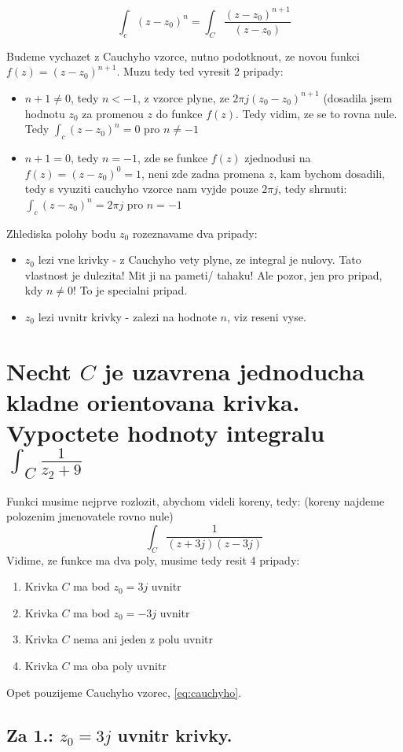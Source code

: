 $$\int_c (z-z_0)^n = \int_C \frac{(z-z_0)^{n+1}}{(z-z_0)}$$

Budeme vychazet z Cauchyho vzorce, nutno podotknout, ze novou funkci $f(z) = (z-z_0)^{n+1}$. Muzu tedy ted vyresit 2 pripady:
\begin{itemize}
\item $n+1 \neq 0$, tedy $n < -1$, z vzorce plyne, ze $2\pi j (z_0 - z_0)^{n+1}$ (dosadila jsem hodnotu $z_0$ za promenou $z$ do funkce $f(z)$. Tedy vidim, ze se to rovna nule. Tedy  $\int_c (z-z_0)^n = 0$ pro $n \neq -1$
\item $n+1 = 0$, tedy $n = -1$, zde se funkce $f(z)$ zjednodusi na $f(z)=(z-z_0)^0 = 1$, neni zde zadna promena $z$, kam bychom dosadili, tedy s vyuziti cauchyho vzorce nam vyjde pouze $2\pi j$, tedy shrnuti:
 $\int_c (z-z_0)^n = 2\pi j$ pro $n= -1$
\end{itemize}

Zhlediska polohy bodu $z_0$ rozeznavame dva pripady:
\begin{itemize}
\item $z_0$ lezi vne krivky - z Cauchyho vety plyne, ze integral je nulovy. Tato vlastnost je dulezita! Mit ji na pameti/ tahaku! Ale pozor, jen pro pripad, kdy $n \neq 0$! To je specialni pripad.
\item $z_0$ lezi uvnitr krivky - zalezi na hodnote $n$, viz reseni vyse. 
\end{itemize}

\newpage

\section{Necht $C$ je uzavrena jednoducha kladne orientovana krivka. Vypoctete hodnoty integralu $\int_C \frac{1}{z_2+9}$}

Funkci musime nejprve rozlozit, abychom videli koreny, tedy: (koreny najdeme polozenim jmenovatele rovno nule)
$$\int_C \frac{1}{(z+3j)(z-3j)}$$
Vidime, ze funkce ma dva poly, musime tedy resit 4 pripady:
\begin{enumerate}
\item Krivka $C$ ma bod $z_0=3j$ uvnitr
\item Krivka $C$ ma bod $z_0=-3j$ uvnitr
\item Krivka $C$ nema ani jeden z polu uvnitr
\item Krivka $C$ ma oba poly uvnitr
\end{enumerate}
Opet pouzijeme Cauchyho vzorec, \ref{eq:cauchyho}. 

\subsection*{Za 1.: $z_0=3j$ uvnitr krivky.}

